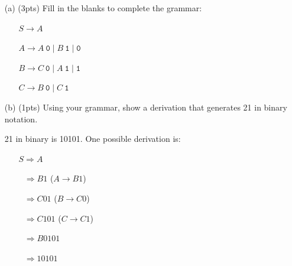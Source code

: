 \documentclass[11pt]{amsart}
\begin{document}
\vspace{.05in}

\begin{enumerate}

\item [(a)] (3pts) Fill in the blanks to complete the grammar:

\begin{enumerate}

\item[] $S\rightarrow A$

\item[] $A\rightarrow A\ \texttt{0} \mid B\ \texttt{1} \mid \texttt{0}$

\item[] $B\rightarrow C\ \texttt{0} \mid A\ \texttt{1} \mid \texttt{1} $

\item[] $C\rightarrow B\ \texttt{0} \mid C\ \texttt{1} $

\end{enumerate}


\vspace{0.25cm}

\item[(b)] (1pts) Using your grammar, show a derivation that generates 21 in binary notation.

\vspace{0.25cm}

21 in binary is 10101. One possible derivation is:

\vspace{0.25cm}

\begin{enumerate}

\item[] $S\Rightarrow A$

\item[] $\ \ \  \Rightarrow B1$ ($A \rightarrow B1$)

\item[] $\ \ \  \Rightarrow C01$ ($B \rightarrow C0$)

\item[] $\ \ \  \Rightarrow C101$ ($C \rightarrow C1$)
 
\item[] $\ \ \  \Rightarrow B0101$ 

\item[] $\ \ \  \Rightarrow 10101$

\end{enumerate}

\vspace{0.25cm}


\end{enumerate}
\end{document}
